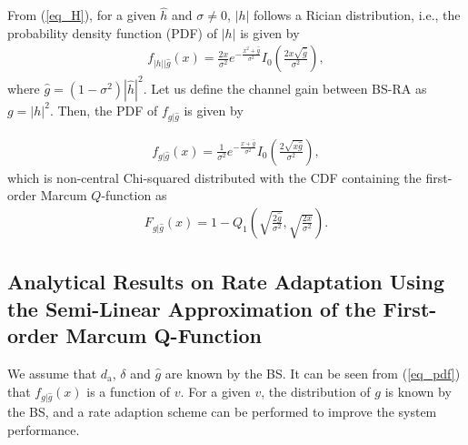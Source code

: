 From (\ref{eq_H}), for a given $\hat{h}$ and $\sigma \neq 0$, $|h|$ follows a Rician distribution, i.e., the  probability density function (PDF) of $|h|$ is given by 
\begin{align}
    f_{|h|\big|\hat{g}}(x) = \frac{2x}{\sigma^2}e^{-\frac{x^2+\hat{g}}{\sigma^2}}I_0\left(\frac{2x\sqrt{\hat{g}}}{\sigma^2}\right),
\end{align}
where $\hat{g} = (1-\sigma^2)|\hat{h}|^2$. Let us define the channel gain between BS-RA as $ g = |{h}|^2$. Then, the PDF of $f_{g|\hat{g}}$ is given by

\begin{align}\label{eq_pdf}
    f_{g|\hat{g}}(x) = \frac{1}{\sigma^2}e^{-\frac{x+\hat{g}}{\sigma^2}}I_0\left(\frac{2\sqrt{x\hat{g}}}{\sigma^2}\right),
\end{align}
which is non-central Chi-squared distributed with the CDF containing the first-order Marcum $Q$-function as
\begin{align}\label{eq_cdf}
    F_{g|\hat{g}}(x) = 1 - Q_1\left( \sqrt{\frac{2\hat{g}}{\sigma^2}}, \sqrt{\frac{2x}{\sigma^2}}  \right).
\end{align}



\subsection{Analytical Results on Rate Adaptation Using the Semi-Linear Approximation of the First-order Marcum Q-Function}\label{In Section III.C,}
We assume that $d_\text{a}$, $\delta $ and $\hat{g}$ are known by the BS. It can be seen from (\ref{eq_pdf}) that $f_{g|\hat{g}}(x)$ is a function of $v$. For a given $v$, the distribution of $g$ is known by the BS, and a rate adaption scheme can be performed to improve the system performance.

